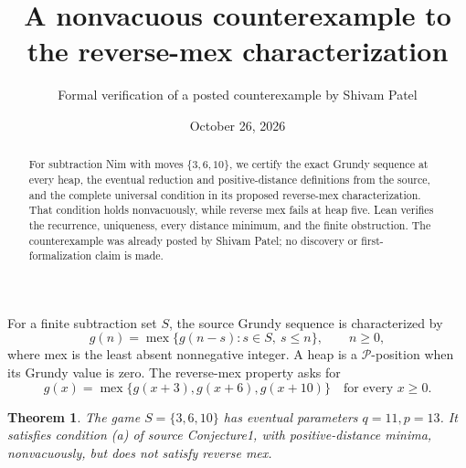 \documentclass[11pt]{article}
\title{A nonvacuous counterexample to the reverse-mex characterization}
\author{Formal verification of a posted counterexample by Shivam Patel}
\date{October 26, 2026}
\newtheorem{theorem}{Theorem}
\newcommand{\mex}{\operatorname{mex}}
\begin{document}
\maketitle
\begin{abstract}
For subtraction Nim with moves $\{3,6,10\}$, we certify the exact Grundy sequence at every heap, the eventual reduction and positive-distance definitions from the source, and the complete universal condition in its proposed reverse-mex characterization. That condition holds nonvacuously, while reverse mex fails at heap five. Lean verifies the recurrence, uniqueness, every distance minimum, and the finite obstruction. The counterexample was already posted by Shivam Patel; no discovery or first-formalization claim is made.
\end{abstract}
For a finite subtraction set $S$, the source Grundy sequence is characterized by
\[
 g(n)=\mex\{g(n-s):s\in S,\ s\le n\},\qquad n\ge0,
\]
where mex is the least absent nonnegative integer. A heap is a $\mathcal P$-position when its Grundy value is zero. The reverse-mex property asks for
\[
 g(x)=\mex\{g(x+3),g(x+6),g(x+10)\}\quad\text{for every }x\ge0.
\]
\begin{theorem}
The game $S=\{3,6,10\}$ has eventual parameters $q=11,p=13$. It satisfies condition (a) of source Conjecture1, with positive-distance minima, nonvacuously, but does not satisfy reverse mex.
\end{theorem}
\end{document}
